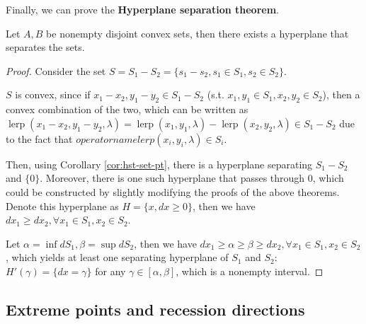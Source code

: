 Finally, we can prove the \textbf{Hyperplane separation theorem}.
\begin{theorem}
  Let \( A, B \) be nonempty disjoint convex sets, then there exists a
  hyperplane that separates the sets.
\end{theorem}

\begin{proof}
  Consider the set \( S = S_{1} - S_{2} = \{s_{1} - s_{2},
  s_{1} \in S_{1}, s_{2} \in S_{2}\}   \).

  \( S \) is convex, since if \( x_{1}-x_{2}, y_{1}-y_{2} \in S_{1}-S_{2} \)
  (s.t. \( x_{1},y_{1} \in S_{1}, x_{2}, y_{2} \in S_{2} \)), then a convex
  combination of the two, which can be written as \(
  \operatorname{lerp}(x_{1}-x_{2},y_{1}-y_{2},\lambda) =
  \operatorname{lerp}(x_{1},y_{1},\lambda) -
  \operatorname{lerp}(x_{2},y_{2},\lambda) \in S_{1}-S_{2} \) due to the fact
  that \( operatorname{lerp}(x_{i},y_{i}, \lambda) \in S_{i} \).

  Then, using Corollary \ref{cor:hst-set-pt}, there is a hyperplane separating
  \( S_{1}-S_{2} \) and \( \{0\}   \). Moreover, there is one such hyperplane
  that passes through \( 0 \), which could be constructed by slightly modifying
  the proofs of the above theorems. Denote this hyperplane as \( H = \{x, dx \ge
  0\}   \), then we have \( dx_{1} \ge  dx_{2}, \forall x_{1} \in S_{1}, x_{2}
  \in S_{2} \).

  Let \( \alpha = \inf dS_{1}, \beta = \sup dS_{2} \), then we have \( dx_{1}
  \ge  \alpha \ge  \beta \ge dx_{2}, \forall x_{1} \in S_{1},x_{2} \in S_{2} \),
  which yields at least one separating hyperplane of \( S_{1} \) and \( S_{2}
  \): \( H'(\gamma) = \{ dx = \gamma\}   \) for any \( \gamma \in [\alpha,\beta]
  \), which is a nonempty interval.
\end{proof}


\subsection{Extreme points and recession directions} %
\label{sub:Extreme points and recession directions}

